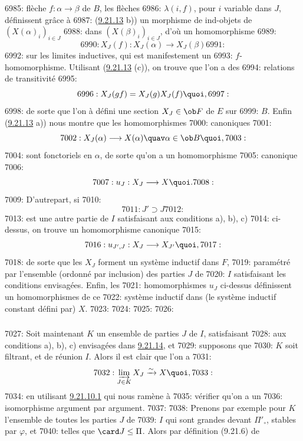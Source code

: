 6985: flèche $f:\alpha\rightarrow \beta$ de $B$, les flèches
6986: $\lambda(i,f)$, pour $i$ variable dans $J$, définissent grâce à
6987: (\hyperref[I.lem9.21.13]{9.21.13} b)) un morphisme de ind-objets de $(X(\alpha)_i)_{i\in J}$
6988: dans $(X(\beta)_i)_{i\in J}$, d'où un homomorphisme
6989: $$
6990: X_J(f):X_J(\alpha)\rightarrow X_J(\beta)
6991: $$
6992: sur les limites inductives, qui est manifestement un
6993: $f$-homomorphisme. Utilisant (\hyperref[I.lem9.21.13]{9.21.13} (c)), on trouve que l'on a des
6994: relations de transitivité
6995: $$
6996: X_J(gf)=X_J(g)X_J(f){\quoi},
6997: $$
6998: de sorte que l'on à défini une section $X_J\in \ob F$ de $E$ sur
6999: $B$. Enfin (\hyperref[I.lem9.21.13]{9.21.13} a)) nous montre que les homomorphismes
7000: canoniques
7001: $$
7002: X_J(\alpha)\longrightarrow X(\alpha)\quav \alpha\in \ob B{\quoi},
7003: $$
7004: sont fonctoriels en $\alpha$, de sorte qu'on a un homomorphisme
7005: canonique
7006: $$
7007: u_J:X_J\longrightarrow X{\quoi}.
7008: $$
7009: D'autre\pageoriginale part, si
7010: $$
7011: J'\supset J
7012: $$
7013: est une autre partie de $I$ satisfaisant aux conditions a), b), c)
7014: ci-dessus, on trouve un homomorphisme canonique
7015: $$
7016: u_{J',J}:X_J\longrightarrow X_{J'}{\quoi},
7017: $$
7018: de sorte que les $X_J$ forment un système inductif dans $F$,
7019: paramétré par l'ensemble (ordonné par inclusion) des parties $J$ de
7020: $I$ satisfaisant les conditions envisagées. Enfin, les
7021: homomorphismes $u_J$ ci-dessus définissent un homomorphismes de ce
7022: système inductif dans (le système inductif constant défini par) $X$.
7023: 
7024: 
7025: \setcounter{subsection}{21} \setcounter{subsubsection}{14}
7026: \subsubsection{}
7027: Soit maintenant $K$ un ensemble de parties $J$ de $I$, satisfaisant
7028: aux conditions a), b), c) envisagées dans \hyperref[I.sec9.21.14]{9.21.14}, et
7029: supposons que
7030: $K$ soit filtrant, et de réunion $I$. Alors il est clair que l'on a
7031: $$
7032: \varinjlim_{J\in K}X_J\xrightarrow{\sim}X{\quoi},
7033: $$
7034: en utilisant \hyperref[I.cor9.21.10.1]{9.21.10.1} qui nous ramène à
7035: vérifier qu'on a un
7036: isomorphisme argument par argument.
7037: 
7038: Prenons par exemple pour $K$ l'ensemble de toutes les parties $J$ de
7039: $I$ qui sont grandes devant $\Pi'_\circ$, stables par $\varphi$, et
7040: telles que $\card J\leq \Pi$. Alors par définition (9.21.6) de
